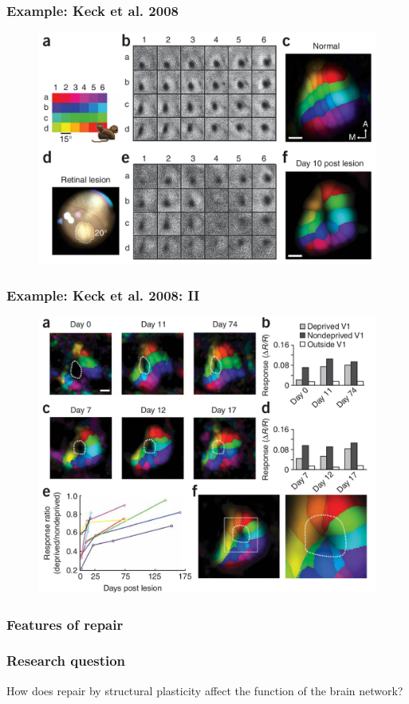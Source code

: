 \begin{frame}[c]
  \frametitle{Example: Keck et al. 2008}
  \begin{figure}[h]
    \centering
    \includegraphics[width=0.8\linewidth]{99_images/keck-figure1}
  \end{figure}
\end{frame}
\begin{frame}[c]
  \frametitle{Example: Keck et al. 2008: II}
  \begin{figure}[h]
    \centering
    \includegraphics[width=0.8\linewidth]{99_images/keck-figure2}
  \end{figure}
\end{frame}
\begin{frame}[c]
  \frametitle{Features of repair}
  
\end{frame}
\begin{frame}[c]
  \frametitle{Research question}
  How does repair by structural plasticity affect the function of the brain network?
\end{frame}
